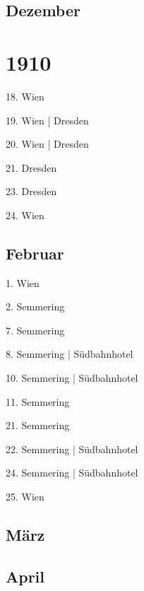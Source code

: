 \documentclass[twoside=false,titlepage=false,open=any, parskip=never, fontsize=10pt, headings=small, chapterprefix=false, appendixprefix=false, DIV=15]{scrbook}
\begin{document}
\begin{multicols}{3}
            \section*{Dezember}
            \chapter*{1910}
            18. Wien\par
            19. Wien | Dresden\par
            20. Wien | Dresden\par
            21. Dresden\par
            23. Dresden\par
            24. Wien\par
            \section*{Februar}
            1. Wien\par
            2. Semmering\par
            7. Semmering\par
            8. Semmering | Südbahnhotel\par
            10. Semmering | Südbahnhotel\par
            11. Semmering\par
            21. Semmering\par
            22. Semmering | Südbahnhotel\par
            24. Semmering | Südbahnhotel\par
            25. Wien\par
            \section*{März}
            \section*{April}

\end{multicols}
\end{document}

